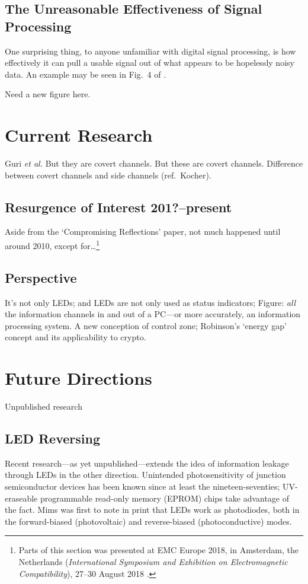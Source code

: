 \documentclass[a4paper,twoside,11pt]{book}
\begin{document}
\subsection{The Unreasonable Effectiveness of Signal Processing}
One surprising thing, to anyone unfamiliar with digital signal processing, is
how effectively it can pull a usable signal out of what appears to be
hopelessly noisy data. An example may be seen in Fig.\ 4 of
\cite{Loughry2002a}.

Need a new figure here.

\section{Current Research}
Guri \emph{et al.} But they are covert channels. But these are covert
channels. Difference between covert channels and side channels
(ref.\ Kocher).
\subsection{Resurgence of Interest 201?--present}
Aside from the `Compromising Reflections' paper, not much happened until
around 2010, except for\ldots\footnote{Parts of this section was presented at
EMC Europe 2018, in Amsterdam, the Netherlands (\emph{International Symposium
and Exhibition on Electromagnetic Compatibility}), 27--30 August 2018
\cite{Loughry2018a}.}
\subsection{Perspective}
It's not only LEDs; and LEDs are not only used as status indicators; Figure:
\emph{all} the information channels in and out of a PC---or more accurately,
an information processing system. A new conception of control zone;
Robinson's `energy gap' concept and its applicability to crypto.
\section{Future Directions}
Unpublished research
\subsection{LED Reversing}
Recent research---as yet unpublished---extends the idea of information leakage
through LEDs in the other direction. Unintended photosensitivity of junction
semiconductor devices has been known since at least the nineteen-seventies;
UV-eraseable programmable read-only memory (EPROM) chips take advantage of the
fact. Mims \citeyear{Mims1973b} was first to note in print that LEDs work as
photodiodes, both in the forward-biased (photovoltaic) and reverse-biased
(photoconductive) modes.
\end{document}
